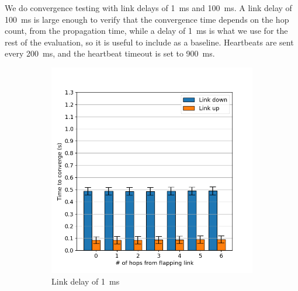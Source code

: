 \documentclass[withindex,glossary,openany]{cam-thesis}
\begin{document}
We do convergence testing with link delays of \SI{1}{\ms} and \SI{100}{\ms}. A link delay of \SI{100}{\ms} is large enough to verify that the convergence time depends on the hop count, from the propagation time, while a delay of \SI{1}{\ms} is what we use for the rest of the evaluation, so it is useful to include as a baseline.  Heartbeats are sent every \SI{200}{\ms}, and the heartbeat timeout is set to \SI{900}{\ms}.

\begin{figure}
\centering
\begin{subfigure}{.5\textwidth}
  \centering
  \includegraphics[width=1\linewidth]{conv_1ms}
  \caption{Link delay of \SI{1}{\ms}}
  \label{fig:conv_1ms}
\end{subfigure}%
\begin{subfigure}{.5\textwidth}
  \centering

\end{subfigure}
\end{figure}
\end{document}
